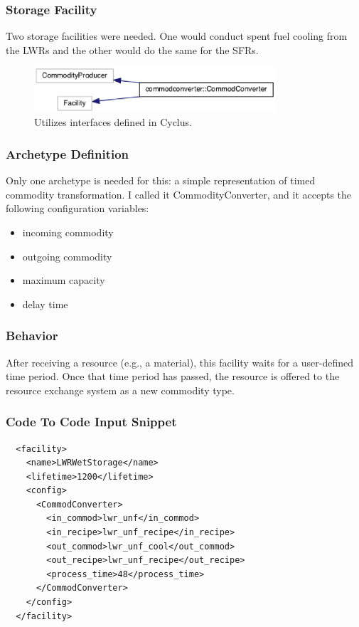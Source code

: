 \begin{frame}[fragile]
  \frametitle{Storage Facility}
Two storage facilities were needed. One would conduct spent fuel cooling from
the LWRs and the other would do the same for the SFRs. 
\begin{figure}[htbp!]
\begin{center}
\includegraphics[width=0.8\textwidth]{cc_inherit}
\end{center}
\caption{Utilizes interfaces defined in Cyclus.}
\label{fig:cc_inherit}
\end{figure}
\end{frame}
\begin{frame}[fragile]
  \frametitle{Archetype Definition}
Only one archetype is needed for this:  a simple representation of timed commodity transformation. 
 I called it CommodityConverter, and it accepts the following configuration variables:
\begin{itemize}
\item incoming commodity
\item outgoing commodity 
\item maximum capacity
\item delay time
\end{itemize}
\end{frame}
\begin{frame}[fragile]
  \frametitle{Behavior}
After receiving a resource
(e.g., a material), this facility waits for a user-defined time period. Once
that time period has passed, the resource is offered to the resource exchange
system as a new commodity type. 
\end{frame}
\begin{frame}[fragile]
  \frametitle{Code To Code Input Snippet}
\begin{lstlisting}
  <facility>
    <name>LWRWetStorage</name>
    <lifetime>1200</lifetime>
    <config>
      <CommodConverter>
        <in_commod>lwr_unf</in_commod>
        <in_recipe>lwr_unf_recipe</in_recipe>
        <out_commod>lwr_unf_cool</out_commod>
        <out_recipe>lwr_unf_recipe</out_recipe>
        <process_time>48</process_time>
      </CommodConverter>
    </config>
  </facility>
\end{lstlisting}
\end{frame}
